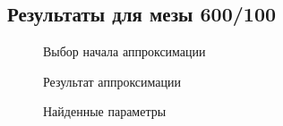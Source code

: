 \documentclass[a4paper,12pt]{article}
\begin{document}
	\subsection{Результаты для мезы 600/100}
		\begin{figure}[H]
			\caption{Выбор начала аппроксимации}
		\end{figure}
		\begin{figure}[H]
			\caption{Результат аппроксимации}
		\end{figure}
		\begin{figure}[H]
			\caption{Найденные параметры}
		\end{figure}	
\newpage
\end{document}
